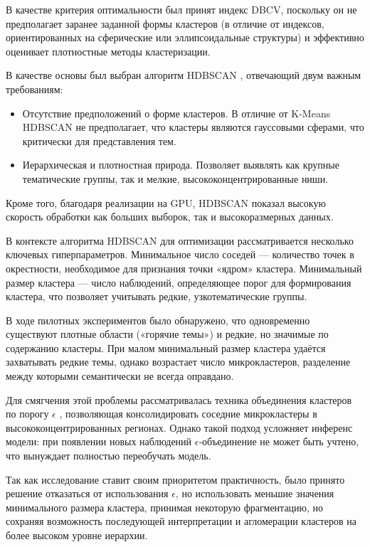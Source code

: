 В качестве критерия оптимальности был принят индекс DBCV, поскольку он не предполагает заранее заданной
формы кластеров (в отличие от индексов, ориентированных на сферические или эллипсоидальные структуры)
и эффективно оценивает плотностные методы кластеризации.

В качестве основы был выбран алгоритм HDBSCAN \parencite{HDBSCAN2013}, отвечающий двум важным требованиям:

\begin{itemize}
    \item Отсутствие предположений о форме кластеров. В отличие от K‑Means HDBSCAN не предполагает,
    что кластеры являются гауссовыми сферами, что критически для представления тем.
    \item Иерархическая и плотностная природа. Позволяет выявлять как крупные тематические группы,
    так и мелкие, высококонцентрированные ниши.
\end{itemize}

Кроме того, благодаря реализации на GPU, HDBSCAN показал высокую скорость обработки
как больших выборок, так и высокоразмерных данных.

В контексте алгоритма HDBSCAN для оптимизации рассматривается несколько ключевых гиперпараметров.
Минимальное число соседей --- количество точек в окрестности, необходимое для признания точки «ядром» кластера.
Минимальный размер кластера --- число наблюдений, определяющее порог для формирования кластера,
что позволяет учитывать редкие, узкотематические группы.

 В ходе пилотных экспериментов было обнаружено, что одновременно существуют плотные области («горячие темы»)
 и редкие, но значимые по содержанию кластеры. При малом минимальный размер кластера удаётся захватывать
 редкие темы, однако возрастает число микрокластеров, разделение между которыми семантически не всегда оправдано.

 Для смягчения этой проблемы рассматривалась техника объединения кластеров по порогу $\epsilon$ \parencite{HDBSCAN2020cluster_selection_epsilon}, позволяющая
 консолидировать соседние микрокластеры в высококонцентрированных регионах. Однако такой подход усложняет
 инференс модели: при появлении новых наблюдений $\epsilon$‑объединение не может быть учтено, что вынуждает
 полностью переобучать модель.

 Так как исследование ставит своим приоритетом практичность, было принято решение отказаться от использования
 $\epsilon$, но использовать меньшие значения минимального размера кластера, принимая некоторую фрагментацию,
 но сохраняя возможность последующей интерпретации и агломерации кластеров на более высоком уровне иерархии.

